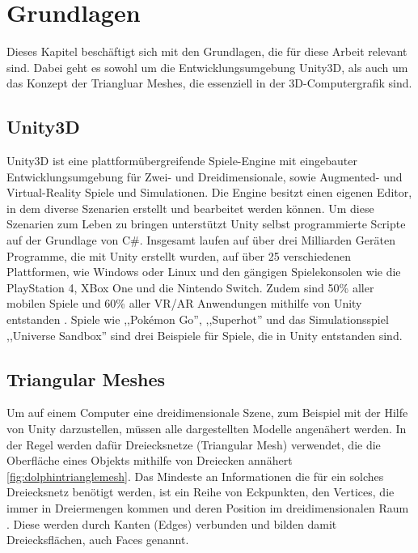 \section{Grundlagen}
Dieses Kapitel besch\"aftigt sich mit den Grundlagen, die f\"ur diese Arbeit relevant sind. Dabei geht es sowohl um die Entwicklungsumgebung Unity3D, als auch um das Konzept der Triangluar Meshes, die essenziell in der 3D-Computergrafik sind.

\subsection{Unity3D}
Unity3D ist eine plattform\"ubergreifende Spiele-Engine mit eingebauter Entwicklungsumgebung f\"ur Zwei- und Dreidimensionale, sowie Augmented- und Virtual-Reality Spiele und Simulationen. Die Engine besitzt einen eigenen Editor, in dem diverse Szenarien erstellt und bearbeitet werden k\"onnen. Um diese Szenarien zum Leben zu bringen unterst\"utzt Unity selbst programmierte Scripte auf der Grundlage von C\#. Insgesamt laufen auf \"uber drei Milliarden Ger\"aten Programme, die mit Unity erstellt wurden, auf \"uber 25 verschiedenen Plattformen, wie Windows oder Linux und den g\"angigen Spielekonsolen wie die PlayStation 4, XBox One und die Nintendo Switch. Zudem sind 50\% aller mobilen Spiele und 60\% aller VR/AR Anwendungen mithilfe von Unity entstanden \cite{Unity}. Spiele wie ,,Pok\'emon Go'', ,,Superhot'' und das Simulationsspiel ,,Universe Sandbox'' sind drei Beispiele f\"ur Spiele, die in Unity entstanden sind.

\subsection{Triangular Meshes}
Um auf einem Computer eine dreidimensionale Szene, zum Beispiel mit der Hilfe von Unity darzustellen, m\"ussen alle dargestellten Modelle angen\"ahert werden. In der Regel werden daf\"ur Dreiecksnetze (Triangular Mesh) verwendet, die die Oberfl\"ache eines Objekts mithilfe von Dreiecken ann\"ahert \ref{fig:dolphintrianglemesh}. Das Mindeste an Informationen die f\"ur ein solches Dreiecksnetz ben\"otigt werden, ist ein Reihe von Eckpunkten, den Vertices, die immer in Dreiermengen kommen und deren Position im dreidimensionalen Raum \cite[S.262]{Shirley2010}. Diese werden durch Kanten (Edges) verbunden und bilden damit Dreiecksfl\"achen, auch Faces genannt.

